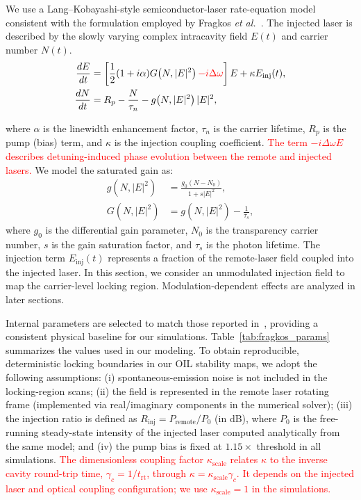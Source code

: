 \documentclass[%
 aip,
 apl,
 amsmath,amssymb,
 reprint,%
 floatfix,
]{revtex4-1}
\begin{document}
We use a Lang--Kobayashi-style semiconductor-laser rate-equation model consistent with the formulation employed by Fragkos \emph{et al.}~\cite{Fragkos2012JLT_AmpLimiter_OIL}. The injected laser is described by the slowly varying complex intracavity field $E(t)$ and carrier number $N(t)$.
\begin{align}
\frac{dE}{dt}
&=
\left[
\frac{1}{2}(1+i\alpha)G\!\left(N,|E|^2\right)
\textcolor{red}{-i\Delta\omega}
\right]E
+\kappa E_{\mathrm{inj}}(t),
\label{eq:rateE}\\
\frac{dN}{dt}
&=
R_p-\frac{N}{\tau_n}
-g\!\left(N,|E|^2\right)|E|^2,
\label{eq:rateN}
\end{align}

where $\alpha$ is the linewidth enhancement factor, $\tau_n$ is the carrier lifetime, $R_p$ is the pump (bias) term, and $\kappa$ is the injection coupling coefficient.
\textcolor{red}{The term $-i\Delta\omega E$ describes detuning-induced phase evolution between the remote and injected lasers.}  We model the saturated gain as:
\begin{align}
g\!\left(N,|E|^2\right)
&=\frac{g_0\left(N-N_0\right)}{1+s|E|^2},
\label{eq:satgain}\\
G\!\left(N,|E|^2\right)
&= g\!\left(N,|E|^2\right) - \frac{1}{\tau_s},
\label{eq:netgain}
\end{align}
where $g_0$ is the differential gain parameter, $N_0$ is the transparency carrier number, $s$ is the gain saturation factor, and $\tau_s$ is the photon lifetime. The injection term $E_{\mathrm{inj}}(t)$ represents a fraction of the remote-laser field coupled into the injected laser. In this section, we consider an unmodulated injection field to map the carrier-level locking region. Modulation-dependent effects are analyzed in later sections.

Internal parameters are selected to match those reported in~\cite{Fragkos2012JLT_AmpLimiter_OIL}, providing a consistent physical baseline for our simulations. Table~\ref{tab:fragkos_params} summarizes the values used in our modeling. To obtain reproducible, deterministic locking boundaries in our OIL stability maps, we adopt the following assumptions: (i) spontaneous-emission noise is not included in the locking-region scans; (ii) the field is represented in the remote laser rotating frame (implemented via real/imaginary components in the numerical solver); (iii) the injection ratio is defined as $R_{\mathrm{inj}}=P_{\mathrm{remote}}/P_0$ (in dB), where $P_0$ is the free-running steady-state intensity of the injected laser computed analytically from the same model; and (iv) the pump bias is fixed at $1.15\times$ threshold in all simulations.
\textcolor{red}{The dimensionless coupling factor $\kappa_{\mathrm{scale}}$ relates $\kappa$ to the inverse cavity round-trip time, $\gamma_c=1/t_{\mathrm{rt}}$, through $\kappa=\kappa_{\mathrm{scale}}\gamma_c$. It depends on the injected laser and optical coupling configuration; we use $\kappa_{\mathrm{scale}}=1$ in the simulations.}
\end{document}
